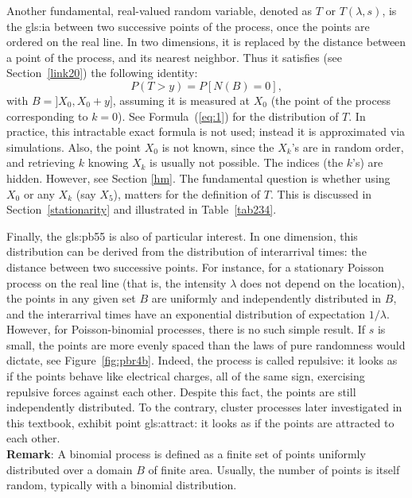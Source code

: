 \documentclass[10pt]{article}
\begin{document}
Another fundamental, real-valued random variable, denoted as $T$ or $T(\lambda,s)$,  is the
\gls{gls:ia} %
between two successive points of the process, once the points are ordered on the real line. In two dimensions, it is replaced by the distance between a point of the process, and its nearest neighbor. Thus it satisfies (see Section~\ref{link20}) the following identity:
$$P(T>y)=P[N(B)=0], $$
with $B = ]X_0, X_0+y]$, assuming it is measured at $X_0$ (the point of the process corresponding to $k=0$). See Formula~(\ref{eq:1}) for the distribution of $T$. In practice, this intractable exact formula is not used; instead it is approximated via simulations. Also, the point $X_0$ is not known, since the $X_k$'s are in random order, and retrieving $k$ knowing $X_k$ is usually not possible.  The indices (the $k$'s) are hidden. However, see Section \ref{hm}. The fundamental question is whether using $X_0$ or any $X_k$ (say $X_5$), matters for the definition of $T$. This is discussed in Section~\ref{stationarity}
and illustrated in Table~\ref{tab234}.




Finally, the
\gls{gls:pb55}  %
is also of particular interest. In one dimension, this distribution can be derived from the distribution of interarrival times: the distance between two successive points. For instance, for a stationary  Poisson process on the real line (that is, the intensity $\lambda$ does not depend on the location), the points in any given set $B$ are uniformly and independently distributed in $B$, and the interarrival times have an exponential distribution of expectation $1/\lambda$. However, for Poisson-binomial processes, there is no such simple result. If $s$ is small, the points are more evenly spaced than the laws of pure randomness would dictate, see Figure~\ref{fig:pbr4b}. Indeed, the process is called \textcolor{index}{repulsive}: it looks as if the points behave like electrical charges, all of the same sign, exercising repulsive forces against each other. Despite this fact, the points are still independently distributed. To the contrary, cluster processes later investigated in this textbook, exhibit point \gls{gls:attract}: it looks as if the points are attracted to each other. \vspace{1ex} \\
{\bf Remark}: A \textcolor{index}{binomial process} is defined as a finite set of points uniformly distributed over a domain $B$ of finite area. Usually, the number of points is itself random, typically with a \textcolor{index}{binomial distribution}.
\end{document}

